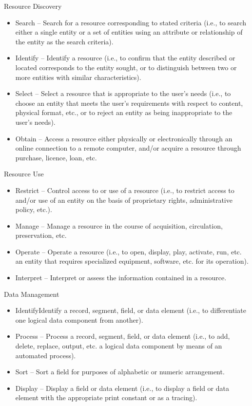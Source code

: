 Resource Discovery
\begin{itemize}
 \setlength{\parskip}{0pt}
 \setlength{\itemsep}{0pt plus 1pt}
  \item Search -- Search for a resource corresponding to stated criteria (i.e., to search either a single entity or a set of entities using an attribute or relationship of the entity as the search criteria).
  \item Identify -- Identify a resource (i.e., to confirm that the entity described or located corresponds to the entity sought, or to distinguish between two or more entities with similar characteristics).
  \item Select -- Select a resource that is appropriate to the user’s needs (i.e., to choose an entity that meets the user’s requirements with respect to content, physical format, etc., or to reject an entity as being inappropriate to the user’s needs).
  \item Obtain -- Access a resource either physically or electronically through an online connection to a remote computer, and/or acquire a resource through purchase, licence, loan, etc.
\end{itemize}

Resource Use
\begin{itemize}
 \setlength{\parskip}{0pt}
 \setlength{\itemsep}{0pt plus 1pt}
 \item Restrict -- Control access to or use of a resource (i.e., to restrict access to and/or use of an entity on the basis of proprietary rights, administrative policy, etc.).
 \item Manage -- Manage a resource in the course of acquisition, circulation, preservation, etc.
 \item Operate -- Operate a resource (i.e., to open, display, play, activate, run, etc. an entity that requires specialized equipment, software, etc. for its operation).
 \item Interpret -- Interpret or assess the information contained in a resource. 
\end{itemize}

Data Management
\begin{itemize}
 \setlength{\parskip}{0pt}
 \setlength{\itemsep}{0pt plus 1pt}
 \item IdentifyIdentify a record, segment, field, or data element (i.e., to differentiate one logical data component from another).
 \item Process -- Process a record, segment, field, or data element (i.e., to add, delete, replace, output, etc. a logical data component by means of an automated process).
 \item Sort -- Sort a field for purposes of alphabetic or numeric arrangement.
 \item Display -- Display a field or data element (i.e., to display a field or data element with the appropriate print constant or as a tracing).
\end{itemize}

